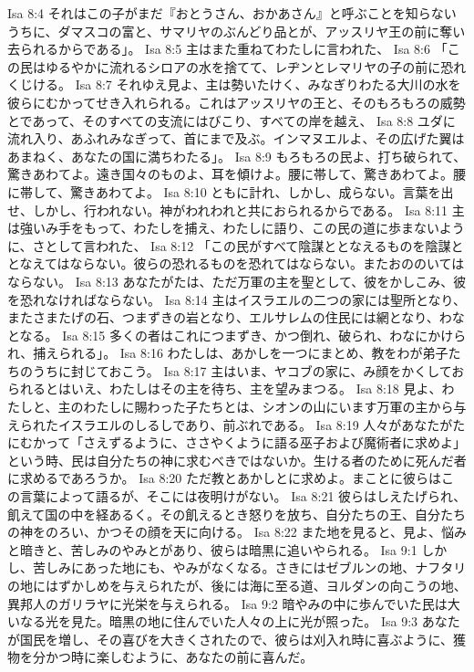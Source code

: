Isa 8:4  それはこの子がまだ『おとうさん、おかあさん』と呼ぶことを知らないうちに、ダマスコの富と、サマリヤのぶんどり品とが、アッスリヤ王の前に奪い去られるからである」。
Isa 8:5  主はまた重ねてわたしに言われた、
Isa 8:6  「この民はゆるやかに流れるシロアの水を捨てて、レヂンとレマリヤの子の前に恐れくじける。
Isa 8:7  それゆえ見よ、主は勢いたけく、みなぎりわたる大川の水を彼らにむかってせき入れられる。これはアッスリヤの王と、そのもろもろの威勢とであって、そのすべての支流にはびこり、すべての岸を越え、
Isa 8:8  ユダに流れ入り、あふれみなぎって、首にまで及ぶ。インマヌエルよ、その広げた翼はあまねく、あなたの国に満ちわたる」。
Isa 8:9  もろもろの民よ、打ち破られて、驚きあわてよ。遠き国々のものよ、耳を傾けよ。腰に帯して、驚きあわてよ。腰に帯して、驚きあわてよ。
Isa 8:10  ともに計れ、しかし、成らない。言葉を出せ、しかし、行われない。神がわれわれと共におられるからである。
Isa 8:11  主は強いみ手をもって、わたしを捕え、わたしに語り、この民の道に歩まないように、さとして言われた、
Isa 8:12  「この民がすべて陰謀ととなえるものを陰謀ととなえてはならない。彼らの恐れるものを恐れてはならない。またおののいてはならない。
Isa 8:13  あなたがたは、ただ万軍の主を聖として、彼をかしこみ、彼を恐れなければならない。
Isa 8:14  主はイスラエルの二つの家には聖所となり、またさまたげの石、つまずきの岩となり、エルサレムの住民には網となり、わなとなる。
Isa 8:15  多くの者はこれにつまずき、かつ倒れ、破られ、わなにかけられ、捕えられる」。
Isa 8:16  わたしは、あかしを一つにまとめ、教をわが弟子たちのうちに封じておこう。
Isa 8:17  主はいま、ヤコブの家に、み顔をかくしておられるとはいえ、わたしはその主を待ち、主を望みまつる。
Isa 8:18  見よ、わたしと、主のわたしに賜わった子たちとは、シオンの山にいます万軍の主から与えられたイスラエルのしるしであり、前ぶれである。
Isa 8:19  人々があなたがたにむかって「さえずるように、ささやくように語る巫子および魔術者に求めよ」という時、民は自分たちの神に求むべきではないか。生ける者のために死んだ者に求めるであろうか。
Isa 8:20  ただ教とあかしとに求めよ。まことに彼らはこの言葉によって語るが、そこには夜明けがない。
Isa 8:21  彼らはしえたげられ、飢えて国の中を経あるく。その飢えるとき怒りを放ち、自分たちの王、自分たちの神をのろい、かつその顔を天に向ける。
Isa 8:22  また地を見ると、見よ、悩みと暗きと、苦しみのやみとがあり、彼らは暗黒に追いやられる。
Isa 9:1  しかし、苦しみにあった地にも、やみがなくなる。さきにはゼブルンの地、ナフタリの地にはずかしめを与えられたが、後には海に至る道、ヨルダンの向こうの地、異邦人のガリラヤに光栄を与えられる。
Isa 9:2  暗やみの中に歩んでいた民は大いなる光を見た。暗黒の地に住んでいた人々の上に光が照った。
Isa 9:3  あなたが国民を増し、その喜びを大きくされたので、彼らは刈入れ時に喜ぶように、獲物を分かつ時に楽しむように、あなたの前に喜んだ。
